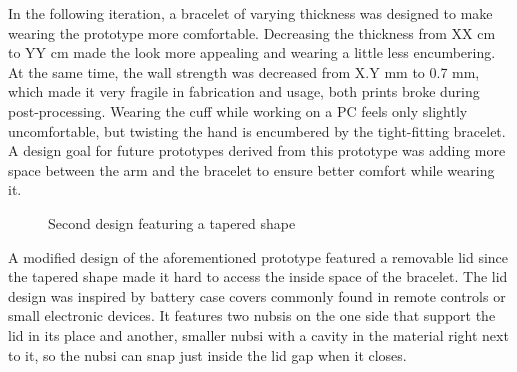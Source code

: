 In the following iteration, a bracelet of varying thickness was designed to make wearing the prototype more comfortable. Decreasing the thickness from XX cm to YY cm made the look more appealing and wearing a little less encumbering. At the same time, the wall strength was decreased from X.Y mm to 0.7 mm, which made it very fragile in fabrication and usage, both prints broke during post-processing. Wearing the cuff while working on a PC feels only slightly uncomfortable, but twisting the hand is encumbered by the tight-fitting bracelet. A design goal for future prototypes derived from this prototype was adding more space between the arm and the bracelet to ensure better comfort while wearing it.

\begin{figure}[bth]
	\myfloatalign
	 \quad
	\caption{Second design featuring a tapered shape}
\end{figure}

A modified design of the aforementioned prototype featured a removable lid since the tapered shape made it hard to access the inside space of the bracelet. The lid design was inspired by battery case covers commonly found in remote controls or small electronic devices. It features two nubsis on the one side that support the lid in its place and another, smaller nubsi with a cavity in the material right next to it, so the nubsi can snap just inside the lid gap when it closes.

